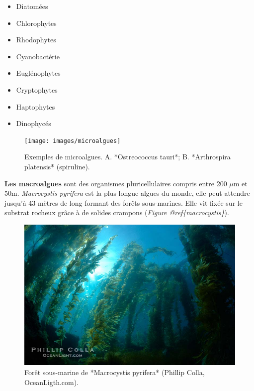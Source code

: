 \documentclass[
]{book}
\providecommand{\tightlist}{%
  \setlength{\itemsep}{0pt}\setlength{\parskip}{0pt}}
\begin{document}
\begin{itemize}
\tightlist
\item
  Diatomées
\item
  Chlorophytes
\item
  Rhodophytes
\item
  Cyanobactérie
\item
  Euglénophytes
\item
  Cryptophytes
\item
  Haptophytes
\item
  Dinophycés
\end{itemize}

\begin{figure}

{\centering \texttt{[image: images/microalgues]} 

}

\caption{Exemples de microalgues. A. *Ostreococcus tauri*; B. *Arthrospira platensis* (spiruline).}\label{fig:microalgue}
\end{figure}

\textbf{Les macroalgues} sont des organismes pluricellulaires compris entre 200 \(\mu\)m et 50m. \emph{Macrocystis pyrifera} est la plus longue algues du monde, elle peut attendre jusqu'à 43 mètres de long formant des forêts sous-marines. Elle vit fixée sur le substrat rocheux grâce à de solides crampons (\emph{Figure @ref\{macrocystis\}}).

\begin{figure}

{\centering \includegraphics{images/macrocystis} 

}

\caption{Forêt sous-marine de *Macrocystis pyrifera* (Phillip Colla, OceanLigth.com).}\label{fig:macrocystis}
\end{figure}
\end{document}
